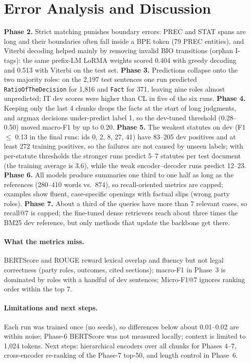 \documentclass[11pt]{article}
\begin{document}
\section{Error Analysis and Discussion}
\label{sec:error}
\textbf{Phase 2.} Strict matching punishes boundary errors: PREC and STAT spans are long and their boundaries often fall inside a BPE token (79 PREC entities), and Viterbi decoding helped mainly by removing invalid BIO transitions (orphan I-tags): the same prefix-LM LoRMA weights scored 0.404 with greedy decoding and 0.513 with Viterbi on the test set. \textbf{Phase 3.} Predictions collapse onto the two majority roles: on the 2{,}197 test sentences one run predicted \texttt{RatioOfTheDecision} for 1{,}816 and \texttt{Fact} for 371, leaving nine roles almost unpredicted; IT dev scores were higher than CL in five of the six runs. \textbf{Phase 4.} Keeping only the last 4 chunks drops the facts at the start of long judgments, and argmax decisions under-predict label 1, so the dev-tuned threshold (0.28--0.50) moved macro-F1 by up to 0.20. \textbf{Phase 5.} The weakest statutes on dev (F1 $\leq$ 0.13 in the final runs: ids 0, 2, 8, 27, 41) have 83--205 dev positives and at least 272 training positives, so the failures are not caused by unseen labels; with per-statute thresholds the stronger runs predict 5--7 statutes per test document (the training average is 3.6), while the weak encoder--decoder runs predict 12--23. \textbf{Phase 6.} All models produce summaries one third to one half as long as the references (280--410 words vs.\ 874), so recall-oriented metrics are capped; examples show fluent, case-specific openings with factual slips (wrong party roles). \textbf{Phase 7.} About a third of the queries have more than 7 relevant cases, so recall@7 is capped; the fine-tuned dense retrievers reach about three times the BM25 dev reference, but only methods that update the backbone get there.

\paragraph{What the metrics miss.} BERTScore \cite{zhang2020bertscore} and ROUGE \cite{lin2004rouge} reward lexical overlap and fluency but not legal correctness (party roles, outcomes, cited sections); macro-F1 in Phase~3 is dominated by roles with a handful of dev sentences; Micro-F1@7 ignores ranking order within the top 7.

\paragraph{Limitations and next steps.} Each run was trained once (no seeds), so differences below about 0.01--0.02 are within noise; Phase-6 BERTScore was not measured locally; context is limited to 1{,}024 tokens. Next steps: hierarchical encoders over all chunks for Phases 4--7, cross-encoder re-ranking of the Phase-7 top-50, and length control in Phase~6.
\end{document}
